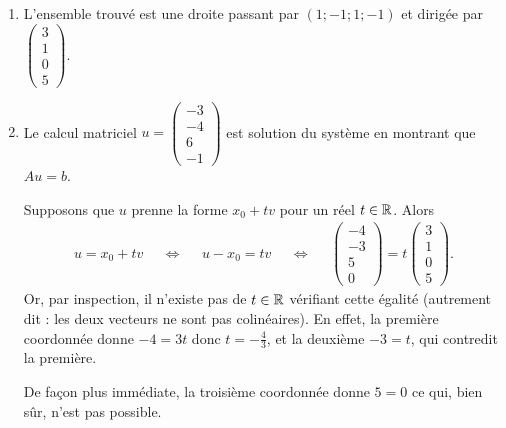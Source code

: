 {\begin{enumerate}
		En $t=1$, nous obtenons $X=(4;0;1;4)$.
		
		En $t=-1$, nous obtenons $X=(-2;-2;1;-6)$.
		\item
		L'ensemble trouvé est une droite passant par $(1;-1;1;-1)$ et dirigée par $\begin{pmatrix}3\\1\\0\\5\end{pmatrix}$.
		\item
		Le calcul matriciel $u =\begin{pmatrix}-3\\-4\\6\\-1\end{pmatrix}$ est solution du système en montrant que $Au = b$.
		
		Supposons que $u$ prenne la forme $x_0 + tv$ pour un réel $t\in\mathbb{R}$.
		Alors 
		\begin{align*}
			u = x_0 + tv && \iff && u-x_0 = tv && \iff && \begin{pmatrix}-4\\-3\\5\\0\end{pmatrix} = t\begin{pmatrix}3\\1\\0\\5\end{pmatrix}.
		\end{align*}
		Or, par inspection, il n'existe pas de $t\in\mathbb{R}$ vérifiant cette égalité (autrement dit : les deux vecteurs ne sont pas colinéaires).
		En effet, la première coordonnée donne $-4 = 3t$ donc $t=-\frac43$, et la deuxième $-3 = t$, qui contredit la première.
		
		De façon plus immédiate, la troisième coordonnée donne $5=0$ ce qui, bien sûr, n'est pas possible.
	\end{enumerate}
	
}






